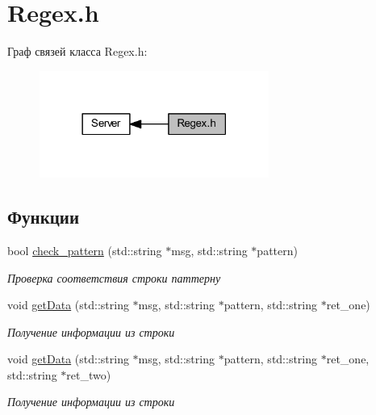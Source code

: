 \hypertarget{group__regexh}{}\section{Regex.\+h}
\label{group__regexh}
Граф связей класса Regex.\+h\+:
\nopagebreak
\begin{figure}[H]
\begin{center}
\leavevmode
\includegraphics[width=213pt]{group__regexh}
\end{center}
\end{figure}
\subsection*{Функции}
\begin{DoxyCompactItemize}
\item 
bool \mbox{\hyperlink{group__regexh_gac4882c93b963bd53fd60978a9661fa30}{check\+\_\+pattern}} (std\+::string $\ast$msg, std\+::string $\ast$pattern)
\begin{DoxyCompactList}\small\item\em Проверка соответствия строки паттерну \end{DoxyCompactList}\item 
void \mbox{\hyperlink{group__regexh_ga524588640ff7393a801141740202d9dc}{get\+Data}} (std\+::string $\ast$msg, std\+::string $\ast$pattern, std\+::string $\ast$ret\+\_\+one)
\begin{DoxyCompactList}\small\item\em Получение информации из строки \end{DoxyCompactList}\item 
void \mbox{\hyperlink{group__regexh_ga0ac985b5fff36005eb80cda832582ca9}{get\+Data}} (std\+::string $\ast$msg, std\+::string $\ast$pattern, std\+::string $\ast$ret\+\_\+one, std\+::string $\ast$ret\+\_\+two)
\begin{DoxyCompactList}\small\item\em Получение информации из строки \end{DoxyCompactList}\end{DoxyCompactItemize}


